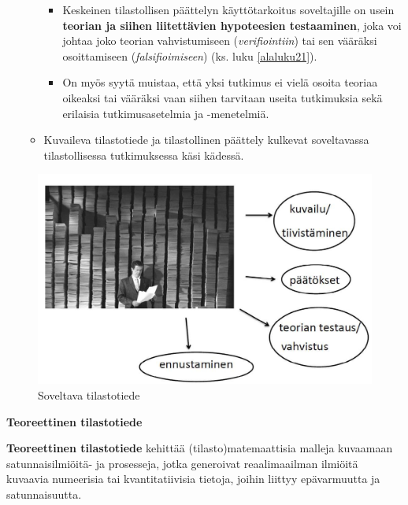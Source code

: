 \documentclass[
]{book}
\providecommand{\tightlist}{%
  \setlength{\itemsep}{0pt}\setlength{\parskip}{0pt}}
\begin{document}
\begin{itemize}
\begin{itemize}
    \begin{itemize}
    \tightlist
    \item
      Keskeinen tilastollisen päättelyn käyttötarkoitus soveltajille on usein \textbf{teorian ja siihen liitettävien hypoteesien testaaminen}, joka voi johtaa joko teorian vahvistumiseen (\emph{verifiointiin}) tai sen vääräksi osoittamiseen (\emph{falsifioimiseen}) (ks. luku \ref{alaluku21}).
    \item
      On myös syytä muistaa, että yksi tutkimus ei vielä osoita teoriaa oikeaksi tai vääräksi vaan siihen tarvitaan useita tutkimuksia sekä erilaisia tutkimusasetelmia ja -menetelmiä.
    \end{itemize}
  \item
    Kuvaileva tilastotiede ja tilastollinen päättely kulkevat soveltavassa tilastollisessa tutkimuksessa käsi kädessä.
  \end{itemize}
\end{itemize}

\begin{figure}

{\centering \includegraphics[width=1\linewidth]{images/soveltava} 

}

\caption{Soveltava tilastotiede}\label{fig:soveltava}
\end{figure}

\hfill\break
\hfill\break

\textbf{Teoreettinen tilastotiede}

\begin{defblock}{}
\textbf{Teoreettinen tilastotiede} kehittää (tilasto)matemaattisia malleja kuvaamaan satunnaisilmiöitä- ja prosesseja, jotka generoivat reaalimaailman ilmiöitä kuvaavia numeerisia tai kvantitatiivisia tietoja, joihin liittyy epävarmuutta ja satunnaisuutta.

\end{defblock}
\end{document}
